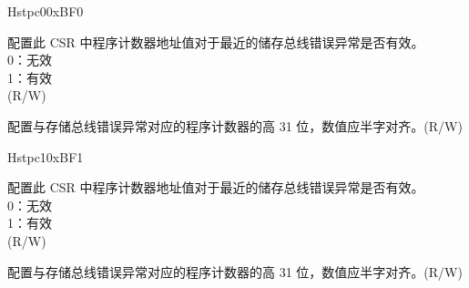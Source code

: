 \begin{register}{H}{stpc0}{0xBF0}\label{regdesc:STPC0}%
%
%
\regnewline%
\begin{regdesc}\begin{reglist}
\label{fielddesc:STPC0_VLD}\item [VLD] 配置此 CSR 中程序计数器地址值对于最近的储存总线错误异常是否有效。\\
0：无效\\
1：有效\\
(R/W)
\label{fielddesc:STPC0_ADDR}\item [{ADDR}] 配置与存储总线错误异常对应的程序计数器的高 31 位，数值应半字对齐。(R/W)
\end{reglist}\end{regdesc}
\end{register}

\begin{register}{H}{stpc1}{0xBF1}\label{regdesc:STPC1}%
%
%
\regnewline%
\begin{regdesc}\begin{reglist}
\label{fielddesc:STPC1_VLD}\item [VLD] 配置此 CSR 中程序计数器地址值对于最近的储存总线错误异常是否有效。\\
0：无效\\
1：有效\\
(R/W)
\label{fielddesc:STPC1_ADDR}\item [{ADDR}] 配置与存储总线错误异常对应的程序计数器的高 31 位，数值应半字对齐。(R/W)
\end{reglist}\end{regdesc}
\end{register}

